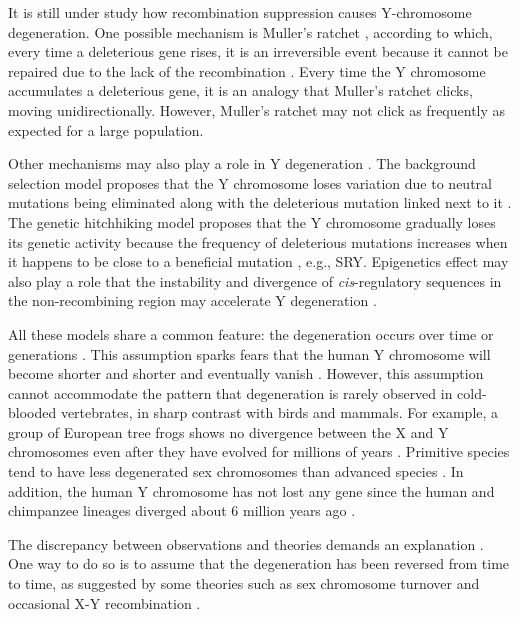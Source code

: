 \documentclass[referee,sn-basic]{sn-jnl}%
\theoremstyle{thmstyleone}%
\theoremstyle{thmstyletwo}%
\theoremstyle{thmstylethree}%
\begin{document}
It is still under study how recombination suppression causes Y-chromosome degeneration. One possible mechanism is Muller’s ratchet \citep{Muller1964, Ohno1967,charlesworth1978model}, according to which, every time a deleterious gene rises, it is an irreversible event because it cannot be repaired due to the lack of the recombination \citep{bachtrog2013chromosome}. Every time the Y chromosome accumulates a deleterious gene, it is an analogy that Muller's ratchet clicks, moving unidirectionally. However, Muller's ratchet may not click as frequently as expected for a large population.  

Other mechanisms may also play a role in Y degeneration \citep{bachtrog2008temporal}. The background selection model proposes that the Y chromosome loses variation due to neutral mutations being eliminated along with the deleterious mutation linked next to it \citep{charlesworth1993effect}. The genetic hitchhiking model proposes that the Y chromosome gradually loses its genetic activity because the frequency of deleterious mutations increases when it happens to be close to a beneficial mutation \citep{rice1987genetic}, e.g., SRY. Epigenetics effect may also play a role that the instability and divergence of {\it cis}-regulatory sequences in the non-recombining region may accelerate Y degeneration \citep{lenormand2020sex}. 


All these models share a common feature: the degeneration occurs over time or generations \citep{Charlesworth2021}. This assumption sparks fears that the human Y chromosome will become shorter and shorter and eventually vanish \citep{graves2006sex}. However, this assumption cannot accommodate the pattern that degeneration is rarely observed in cold-blooded vertebrates, in sharp contrast with birds and mammals. For example, a group of European tree frogs shows no divergence between the X and Y chromosomes even after they have evolved for millions of years \citep{stock2011ever}. Primitive species tend to have less degenerated sex chromosomes than advanced species \citep{gschwend2012sex}. In addition, the human Y chromosome has not lost any gene since the human and chimpanzee lineages diverged about 6 million years ago \citep{hughes2012strict}. 

The discrepancy between observations and theories demands an explanation \citep{Kratochvil2021}. One way to do so is to assume that the degeneration has been reversed from time to time, as suggested by some theories such as sex chromosome turnover \citep{schartl2004sex,miura2017sex} and occasional X-Y recombination \citep{perrin2009sex,stock2013low,rodrigues2018sex}. 
\end{document}
